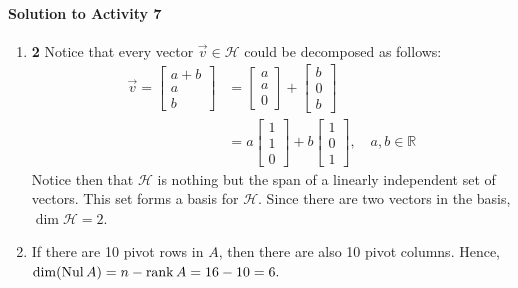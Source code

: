 \paragraph{Solution to Activity 7}
\begin{enumerate}
	\item \textbf{2} Notice that every vector \(\vec{v} \in \mathcal{H}\) could be decomposed as follows:
		\begin{align*}
			\vec{v} = \begin{bmatrix}a + b \\ a \\ b\end{bmatrix} &= \begin{bmatrix}a \\ a \\ 0\end{bmatrix} + \begin{bmatrix}b \\ 0 \\ b\end{bmatrix} \\
											&= a\begin{bmatrix}1 \\ 1 \\ 0\end{bmatrix} + b\begin{bmatrix}1 \\ 0 \\ 1\end{bmatrix}, \quad a, b \in \mathbb{R}
		\end{align*}
		Notice then that \(\mathcal{H}\) is nothing but the span of a linearly independent set of vectors. This set forms a basis for \(\mathcal{H}\). Since there are two
		vectors in the basis, \(\dim \mathcal{H} = 2\).

	\item If there are 10 pivot rows in \(A\), then there are also 10 pivot columns. Hence, \(\dim(\operatorname{Nul} A) = n - \operatorname{rank} A = 16 - 10 = 6.\)


\end{enumerate}
